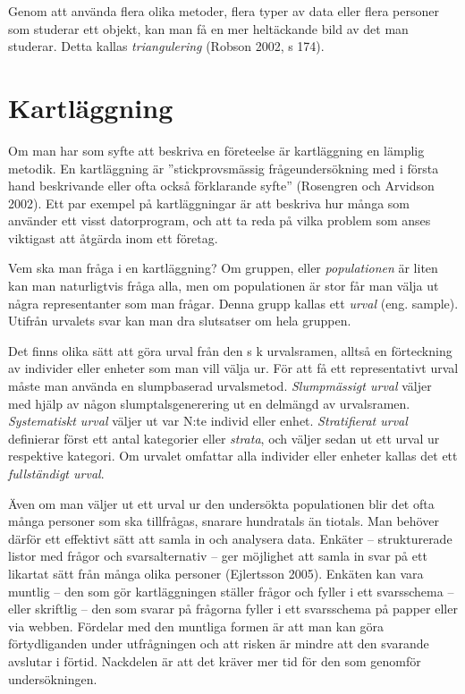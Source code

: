 Genom att använda flera olika metoder, flera typer av data eller flera
personer som studerar ett objekt, kan man få en mer heltäckande bild av
det man studerar. Detta kallas \emph{triangulering} (Robson 2002, s
174).

\section{Kartläggning }\label{kartluxe4ggning}

Om man har som syfte att beskriva en företeelse är kartläggning en
lämplig metodik. En kartläggning är ''stickprovsmässig frågeundersökning
med i första hand beskrivande eller ofta också förklarande syfte''
(Rosengren och Arvidson 2002). Ett par exempel på kartläggningar är att
beskriva hur många som använder ett visst datorprogram, och att ta reda
på vilka problem som anses viktigast att åtgärda inom ett företag.

Vem ska man fråga i en kartläggning? Om gruppen, eller
\emph{populationen} är liten kan man naturligtvis fråga alla, men om
populationen är stor får man välja ut några representanter som man
frågar. Denna grupp kallas ett \emph{urval} (eng. sample). Utifrån
urvalets svar kan man dra slutsatser om hela gruppen.

Det finns olika sätt att göra urval från den s k urvalsramen, alltså en
förteckning av individer eller enheter som man vill välja ur. För att få
ett representativt urval måste man använda en slumpbaserad urvalsmetod.
\emph{Slumpmässigt urval} väljer med hjälp av någon slumptalsgenerering
ut en delmängd av urvalsramen. \emph{Systematiskt urval} väljer ut var
N:te individ eller enhet. \emph{Stratifierat urval} definierar först ett
antal kategorier eller \emph{strata}, och väljer sedan ut ett urval ur
respektive kategori. Om urvalet omfattar alla individer eller enheter
kallas det ett \emph{fullständigt urval}.

Även om man väljer ut ett urval ur den undersökta populationen blir det
ofta många personer som ska tillfrågas, snarare hundratals än tiotals.
Man behöver därför ett effektivt sätt att samla in och analysera data.
Enkäter -- strukturerade listor med frågor och svarsalternativ -- ger
möjlighet att samla in svar på ett likartat sätt från många olika
personer (Ejlertsson 2005). Enkäten kan vara muntlig -- den som gör
kartläggningen ställer frågor och fyller i ett svarsschema -- eller
skriftlig -- den som svarar på frågorna fyller i ett svarsschema på
papper eller via webben. Fördelar med den muntliga formen är att man kan
göra förtydliganden under utfrågningen och att risken är mindre att den
svarande avslutar i förtid. Nackdelen är att det kräver mer tid för den
som genomför undersökningen.

